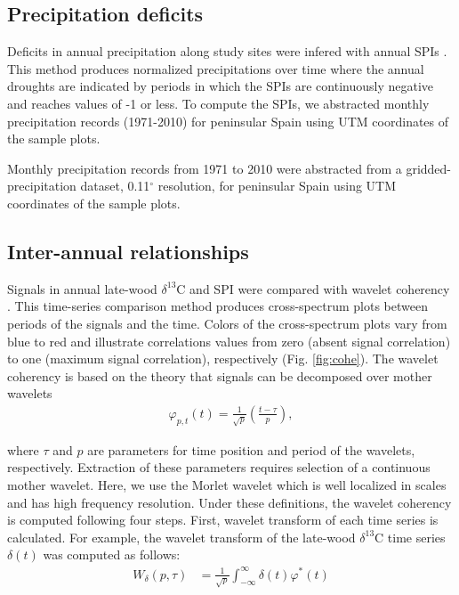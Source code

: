 \documentclass[review,authoryear]{elsarticle}
\begin{document}
\subsection{Precipitation deficits}
Deficits in annual precipitation along study sites were infered with
annual \glspl{SPI} \citep{McKee1993}. This method produces normalized
precipitations over time where the annual droughts are
indicated by periods in which the \glspl{SPI} are continuously
negative and reaches values of -1 or less. To compute the \glspl{SPI},
we abstracted monthly precipitation records (1971-2010) for peninsular
Spain \citep[~Spain02]{Herrera2015} using UTM coordinates of the
sample plots.


 Monthly precipitation records from
1971 to 2010 were abstracted from a gridded-precipitation dataset,
0.11$^{\circ}$ resolution, for peninsular Spain
\citep[~Spain02]{Herrera2015} using UTM coordinates of the sample
plots.

\subsection{Inter-annual relationships}
Signals in annual late-wood $\delta^{13}$C and \gls{SPI} were compared
with wavelet coherency \citep{Cazelles2008}. This time-series
comparison method produces cross-spectrum plots between periods of the
signals and the time. Colors of the cross-spectrum plots vary from
blue to red and illustrate correlations values from zero (absent
signal correlation) to one (maximum signal correlation), respectively
(Fig. \ref{fig:cohe}). The wavelet coherency is based on the theory
that signals can be decomposed over mother wavelets
\begin{align}
\varphi_{p,t}(t)=\frac{1}{\sqrt{p}}\left(\frac{t-\tau}{p}\right)\mathrm{,}
\end{align}

where $\tau$ and $p$ are parameters for time position and period of
the wavelets, respectively.  Extraction of these parameters requires
selection of a continuous mother wavelet. Here, we use the Morlet
wavelet \citep{Torrence1998} which is well localized in scales and has
high frequency resolution. Under these definitions, the wavelet
coherency is computed following four steps. First, wavelet transform
of each time series is calculated. For example, the wavelet transform
of the late-wood $\delta^{13}$C time series $\delta(t)$ was computed
as follows:
\begin{align}\label{eq:wtransform}
W_{\delta}(p,\tau)
&=\frac{1}{\sqrt{p}}\int_{-\infty}^{\infty}\delta(t)
\varphi^{*}(t)
\end{align}
\end{document}
